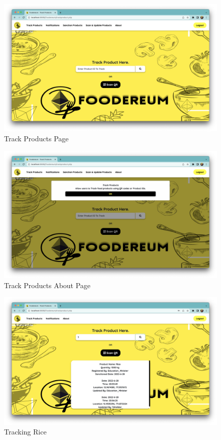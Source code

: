 \documentclass[12pt,a4paper,twocolumn,fleqn]{article}
\begin{document}
\begin{figure} [H]
\includegraphics[width=15cm]{media/Track.png}
\centering
\caption{Track Products Page}
\end{figure}
\begin{figure} [H]
\includegraphics[width=15cm]{media/Track_About.png}
\centering
\caption{Track Products About Page}
\end{figure}
\begin{figure} [H]
\includegraphics[width=15cm]{media/Rice_Track.png}
\centering
\caption{Tracking Rice}
\end{figure}
\end{document}
